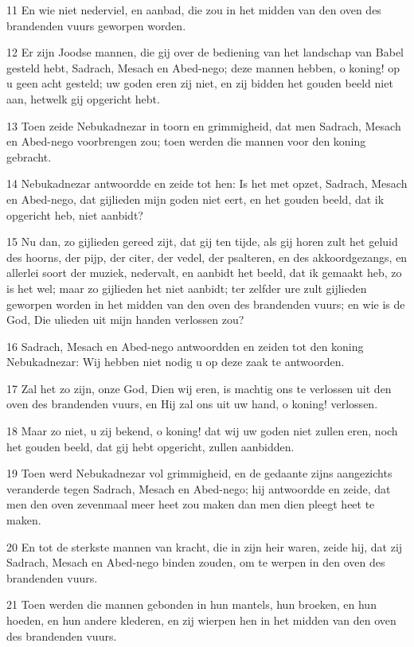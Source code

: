 \par 11 En wie niet nederviel, en aanbad, die zou in het midden van den oven des brandenden vuurs geworpen worden.
\par 12 Er zijn Joodse mannen, die gij over de bediening van het landschap van Babel gesteld hebt, Sadrach, Mesach en Abed-nego; deze mannen hebben, o koning! op u geen acht gesteld; uw goden eren zij niet, en zij bidden het gouden beeld niet aan, hetwelk gij opgericht hebt.
\par 13 Toen zeide Nebukadnezar in toorn en grimmigheid, dat men Sadrach, Mesach en Abed-nego voorbrengen zou; toen werden die mannen voor den koning gebracht.
\par 14 Nebukadnezar antwoordde en zeide tot hen: Is het met opzet, Sadrach, Mesach en Abed-nego, dat gijlieden mijn goden niet eert, en het gouden beeld, dat ik opgericht heb, niet aanbidt?
\par 15 Nu dan, zo gijlieden gereed zijt, dat gij ten tijde, als gij horen zult het geluid des hoorns, der pijp, der citer, der vedel, der psalteren, en des akkoordgezangs, en allerlei soort der muziek, nedervalt, en aanbidt het beeld, dat ik gemaakt heb, zo is het wel; maar zo gijlieden het niet aanbidt; ter zelfder ure zult gijlieden geworpen worden in het midden van den oven des brandenden vuurs; en wie is de God, Die ulieden uit mijn handen verlossen zou?
\par 16 Sadrach, Mesach en Abed-nego antwoordden en zeiden tot den koning Nebukadnezar: Wij hebben niet nodig u op deze zaak te antwoorden.
\par 17 Zal het zo zijn, onze God, Dien wij eren, is machtig ons te verlossen uit den oven des brandenden vuurs, en Hij zal ons uit uw hand, o koning! verlossen.
\par 18 Maar zo niet, u zij bekend, o koning! dat wij uw goden niet zullen eren, noch het gouden beeld, dat gij hebt opgericht, zullen aanbidden.
\par 19 Toen werd Nebukadnezar vol grimmigheid, en de gedaante zijns aangezichts veranderde tegen Sadrach, Mesach en Abed-nego; hij antwoordde en zeide, dat men den oven zevenmaal meer heet zou maken dan men dien pleegt heet te maken.
\par 20 En tot de sterkste mannen van kracht, die in zijn heir waren, zeide hij, dat zij Sadrach, Mesach en Abed-nego binden zouden, om te werpen in den oven des brandenden vuurs.
\par 21 Toen werden die mannen gebonden in hun mantels, hun broeken, en hun hoeden, en hun andere klederen, en zij wierpen hen in het midden van den oven des brandenden vuurs.
